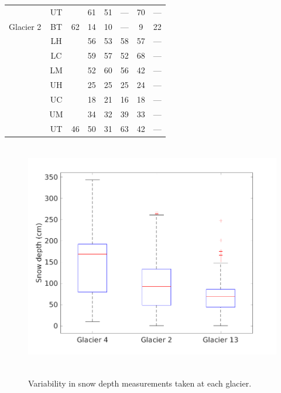 \documentclass[12pt]{article}
\begin{document}
\begin{table}[]
\begin{tabular}{cccccccc}
 & UT &  & 61 & 51 & --- & 70 & --- \\
\multirow{-8}{*}{Glacier 2} & BT & \multirow{-8}{*}{62} & 14 & 10 & --- & 9 & 22 \\
\rowcolor[HTML]{EFEFEF} 
\cellcolor[HTML]{EFEFEF} & LH & \cellcolor[HTML]{EFEFEF} & 56 & 53 & 58 & 57 & --- \\
\rowcolor[HTML]{EFEFEF} 
\cellcolor[HTML]{EFEFEF} & LC & \cellcolor[HTML]{EFEFEF} & 59 & 57 & 52 & 68 & --- \\
\rowcolor[HTML]{EFEFEF} 
\cellcolor[HTML]{EFEFEF} & LM & \cellcolor[HTML]{EFEFEF} & 52 & 60 &56 & 42 & --- \\
\rowcolor[HTML]{EFEFEF} 
\cellcolor[HTML]{EFEFEF} & UH & \cellcolor[HTML]{EFEFEF} &25 & 25 & 25 & 24 & --- \\
\rowcolor[HTML]{EFEFEF} 
\cellcolor[HTML]{EFEFEF} & UC & \cellcolor[HTML]{EFEFEF} & 18 & 21 & 16 & 18 & --- \\
\rowcolor[HTML]{EFEFEF} 
\cellcolor[HTML]{EFEFEF} & UM & \cellcolor[HTML]{EFEFEF} & 34 & 32 & 39 & 33 & --- \\
\rowcolor[HTML]{EFEFEF} 
\multirow{-7}{*}{\cellcolor[HTML]{EFEFEF}Glacier 13} & UT & \multirow{-7}{*}{\cellcolor[HTML]{EFEFEF}46} & 50 & 31 & 63 & 42 & ---
\end{tabular}
\end{table}



{
\begin{figure} 
\centering
	\includegraphics[height = 10cm]{box_depth.png}\\
	\caption{Variability in snow depth measurements taken at each glacier.}
	\label{fig:box_depth}
\end{figure}
}
\end{document}
